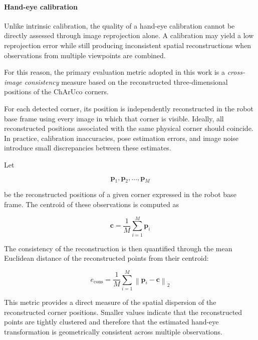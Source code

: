 \paragraph{Hand-eye calibration}

Unlike intrinsic calibration, the quality of a hand-eye calibration cannot be directly assessed through image reprojection alone. A calibration may yield a low reprojection error while still producing inconsistent spatial reconstructions when observations from multiple viewpoints are combined.

For this reason, the primary evaluation metric adopted in this work is a \textit{cross-image consistency} measure based on the reconstructed three-dimensional positions of the ChArUco corners.

For each detected corner, its position is independently reconstructed in the robot base frame using every image in which that corner is visible. Ideally, all reconstructed positions associated with the same physical corner should coincide. In practice, calibration inaccuracies, pose estimation errors, and image noise introduce small discrepancies between these estimates.

Let

\begin{equation}
	\mathbf{p}_1,\mathbf{p}_2,\ldots,\mathbf{p}_M
\end{equation}

be the reconstructed positions of a given corner expressed in the robot base frame. The centroid of these observations is computed as

\begin{equation}
	\mathbf{c}
	=
	\frac{1}{M}
	\sum_{i=1}^{M}
	\mathbf{p}_i
	\label{eq:centroid}
\end{equation}

The consistency of the reconstruction is then quantified through the mean Euclidean distance of the reconstructed points from their centroid:

\begin{equation}
	e_{\mathrm{cons}}
	=
	\frac{1}{M}
	\sum_{i=1}^{M}
	\left\|
	\mathbf{p}_i-\mathbf{c}
	\right\|_2
	\label{eq:consistency_metric}
\end{equation}






This metric provides a direct measure of the spatial dispersion of the reconstructed corner positions. Smaller values indicate that the reconstructed points are tightly clustered and therefore that the estimated hand-eye transformation is geometrically consistent across multiple observations.

